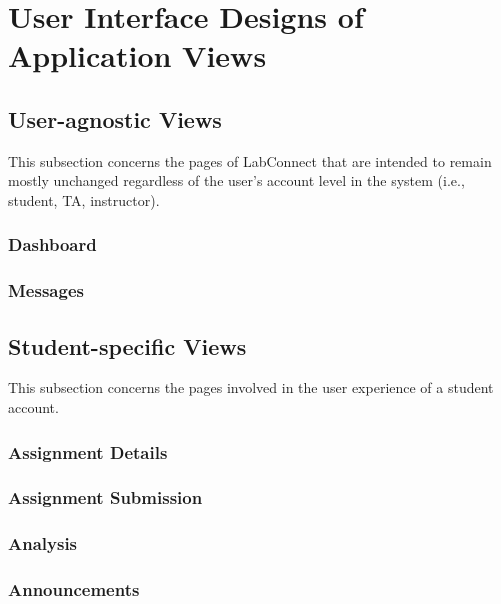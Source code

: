 \documentclass[a4paper, 12pt]{article}
\begin{document}
    
    
    
    
    \section{User Interface Designs of Application Views}
    
    
    \subsection{User-agnostic Views}
    
    This subsection concerns the pages of LabConnect that are intended to remain mostly unchanged regardless of the user's account level in the system
    (i.e., student, TA, instructor).
    
    \subsubsection{Dashboard}
    
    \subsubsection{Messages}
    
    
    \subsection{Student-specific Views}
    
    This subsection concerns the pages involved in the user experience of a student account.
    
    \subsubsection{Assignment Details}
    
    \subsubsection{Assignment Submission}
    
    \subsubsection{Analysis}
    
    \subsubsection{Announcements}
    
\end{document}
